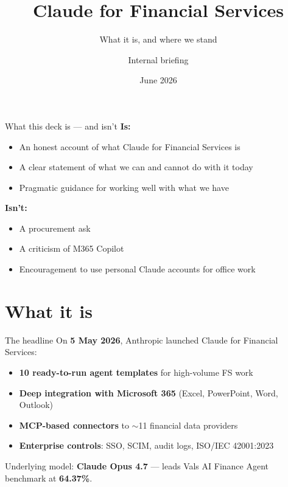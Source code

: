 \documentclass[11pt,aspectratio=169]{beamer}
\title{Claude for Financial Services}
\subtitle{What it is, and where we stand}
\author{Internal briefing}
\institute{Informational --- no procurement ask}
\date{June 2026}
\newcommand{\hl}[1]{\textbf{\textcolor{accentpurple}{#1}}}
\begin{document}
\maketitle

\begin{frame}{What this deck is --- and isn't}
  \textbf{Is:}
  \begin{itemize}
    \item An honest account of what Claude for Financial Services is
    \item A clear statement of what we can and cannot do with it today
    \item Pragmatic guidance for working well with what we have
  \end{itemize}
  \vfill
  \textbf{Isn't:}
  \begin{itemize}
    \item A procurement ask
    \item A criticism of M365 Copilot
    \item Encouragement to use personal Claude accounts for office work
  \end{itemize}
\end{frame}

\section{What it is}

\begin{frame}{The headline}
  On \hl{5 May 2026}, Anthropic launched Claude for Financial Services:
  \begin{itemize}
    \item \textbf{10 ready-to-run agent templates} for high-volume FS work
    \item \textbf{Deep integration with Microsoft 365} (Excel, PowerPoint, Word, Outlook)
    \item \textbf{MCP-based connectors} to $\sim$11 financial data providers
    \item \textbf{Enterprise controls}: SSO, SCIM, audit logs, ISO/IEC 42001:2023
  \end{itemize}

  \vfill
  Underlying model: \hl{Claude Opus 4.7} --- leads Vals AI Finance Agent benchmark at \hl{64.37\%}.
\end{frame}
\end{document}
